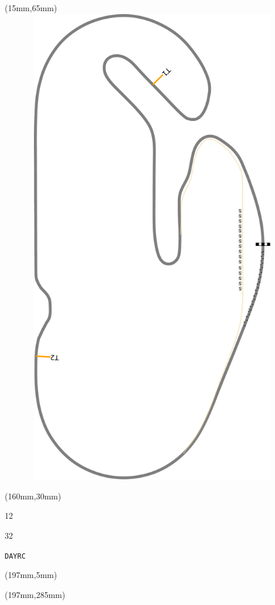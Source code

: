 \begin{textblock*}{185mm}(15mm,65mm)%
\centering
\mbox{\includegraphics[width=185mm,height=210mm,keepaspectratio]{PT/DAYRC.pdf}}
\end{textblock*}
\begin{textblock*}{40mm}(160mm,30mm)%
\Large
\par{} 
\par12 
\par32 
\par\hfill\tiny\tt DAYRC\\
\end{textblock*}
\begin{textblock*}{20mm}(197mm,5mm)%
\fbox{\thepage}
\label{DAYRC}
\end{textblock*}
\begin{textblock*}{20mm}(197mm,285mm)%
\fbox{\thepage}
\end{textblock*}

